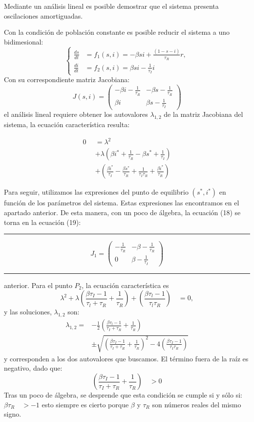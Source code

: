 \documentclass[twocolumn,aps,prl]{revtex4-1}
\newcommand*\sepline{%
  \begin{center}
    \rule[1ex]{.5\textwidth}{.5pt}
  \end{center}}
\begin{document}
Mediante un análisis lineal es posible demostrar que el sistema presenta oscilaciones amortiguadas. 

Con la condición de población constante es posible reducir el sistema a uno bidimesional:
$$ \left\lbrace
\begin{aligned}
\frac{d s}{d t} &= f_1(s, i) = -\beta s i+\frac{(1-s-i)}{\tau_{R}} r , \\
\frac{d i}{d t} &= f_2(s, i) = \beta s i-\frac{1}{\tau_{I}} i  
\end{aligned}
\right.
$$
Con su correspondiente matriz Jacobiana:
$$
J (s, i) = 
\left(
  \begin{array}{cc}
-\beta i - \frac{1}{\tau_{R}} & -\beta s - \frac{1}{\tau_{R}} \\
 \beta i                     &   \beta s - \frac{1}{\tau_{I}}
  \end{array}
\right)
$$
el análisis lineal requiere obtener los autovalores $\lambda_{1,2}$ de la matriz Jacobiana del sistema, la ecuación característica resulta:

$$
\begin{aligned}
  0 & = \lambda^{2} \\
  \quad & +\lambda\left(\beta i^{*}+\frac{1}{\tau_{R}}-\beta s^{*}+\frac{1}{\tau_{I}}\right) \\
  \quad & +\left(\frac{\beta i^{*}}{\tau_{I}}-\frac{\beta s^{*}}{\tau_{R}}+\frac{1}{\tau_{I} \tau_{R}}+\frac{\beta i^{*}}{\tau_{R}}\right)
\end{aligned}
$$

Para seguir, utilizamos las expresiones del punto de equilibrio $\left(s^{*}, i^{*}\right)$ en función de los parámetros del sistema. Estas expresiones las encontramos en el apartado anterior. De esta manera, con un poco de álgebra, la ecuación (18) se torna en la ecuación (19):

\sepline
$$
J_1 = 
\left(
  \begin{array}{cc}
 - \frac{1}{\tau_{R}} & -\beta - \frac{1}{\tau_{R}} \\
 0                    &  \beta - \frac{1}{\tau_{I}}
  \end{array}
\right)
$$
\sepline

anterior. Para el punto $P_2$, la ecuación característica es
$$
\lambda^{2}+\lambda\left(\frac{\beta \tau_{I}-1}{\tau_{l}+\tau_{R}}+\frac{1}{\tau_{R}}\right)+\left(\frac{\beta \tau_{l}-1}{\tau_{l} \tau_{R}}\right) \quad=0, 
$$
y las soluciones, $\lambda_{1, 2}$ son:
$$
\begin{aligned}
  \lambda_{1,2} =
  & -\frac{1}{2}\left(\frac{\beta \tau_{l}-1}{\tau_{I}+\tau_{R}}+\frac{1}{\tau_{R}}\right) \\
  &\pm \sqrt{\left(\frac{\beta \tau_{I}-1}{\tau_{I}+\tau_{R}}+\frac{1}{\tau_{R}}\right)^{2}-4\left(\frac{\beta \tau_{I}-1}{\tau_{I} \tau_{R}}\right)} 
\end{aligned}
$$
y corresponden a los dos autovalores que buscamos. El término fuera de la raíz es negativo, dado que:
$$
\left(\frac{\beta \tau_{I}-1}{\tau_{I}+\tau_{R}}+\frac{1}{\tau_{R}}\right) \quad>0
$$
Tras un poco de álgebra, se desprende que esta condición se cumple si y sólo si:
$\beta \tau_{R} \quad>-1$
esto siempre es cierto porque $\beta$ y $\tau_{R}$ son números reales del mismo signo.
\end{document}
